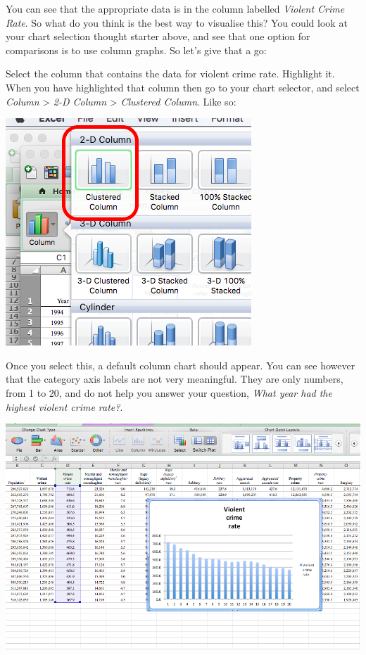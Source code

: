 \documentclass[]{book}
\theoremstyle{definition}
\theoremstyle{definition}
\theoremstyle{definition}
\theoremstyle{remark}
\begin{document}
You can see that the appropriate data is in the column labelled
\emph{Violent Crime Rate}. So what do you think is the best way to
visualise this? You could look at your chart selection thought starter
above, and see that one option for comparisons is to use column graphs.
So let's give that a go:

Select the column that contains the data for violent crime rate.
Highlight it. When you have highlighted that column then go to your
chart selector, and select \emph{Column} \textgreater{} \emph{2-D
Column} \textgreater{} \emph{Clustered Column}. Like so:

\includegraphics{imgs/desc_viz_1.png}

Once you select this, a default column chart should appear. You can see
however that the category axis labels are not very meaningful. They are
only numbers, from 1 to 20, and do not help you answer your question,
\emph{What year had the highest violent crime rate?}.

\includegraphics{imgs/desc_viz_2.png}
\end{document}
